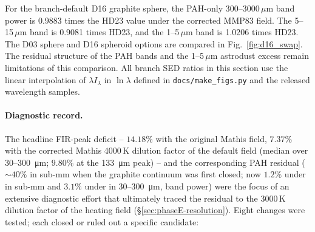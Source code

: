 \documentclass{my_memo}
\begin{document}
For the branch-default D16 graphite sphere, the PAH-only
300--3000\,$\mu$m band power is 0.9883 times the HD23 value under
the corrected MMP83 field. The 5--15\,$\mu$m band is 0.9081 times
HD23, and the 1--5\,$\mu$m band is 1.0206 times HD23. The D03 sphere
and D16 spheroid options are compared in
Fig.~\ref{fig:d16_swap}. The residual structure of the PAH bands
and the 1--5\,$\mu$m astrodust excess remain limitations of this
comparison. All branch SED ratios in this section use the linear
interpolation of $\lambda I_\lambda$ in $\ln\lambda$ defined in
\texttt{docs/make\_figs.py} and the released wavelength samples.

\paragraph{Diagnostic record.}
The headline FIR-peak deficit -- $14.18\%$ with the original Mathis
field, $7.37\%$ with the corrected Mathis 4000\,K dilution factor of
the default field (median over 30--\SI{300}{\micro\meter}; $9.80\%$ at
the \SI{133}{\micro\meter} peak) -- and the corresponding PAH residual
($\sim 40\%$ in sub-mm when the graphite continuum was first closed;
now $1.2\%$ under in sub-mm and $3.1\%$ under in
30--\SI{300}{\micro\meter}, band power) were the focus of an extensive
diagnostic effort that ultimately traced the residual to the 3000\,K
dilution factor of the heating field (\S\ref{sec:phaseE-resolution}).
Eight changes were tested; each closed or ruled out a specific
candidate:
\end{document}
